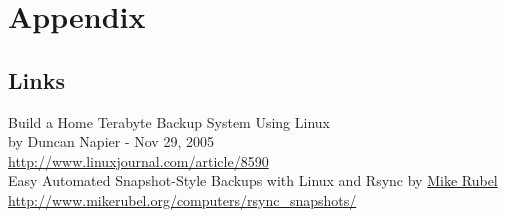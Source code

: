 \documentclass[12pt,letterpaper,dvips]{article}
\begin{document}

\clearpage
\newpage
\section*{Appendix}

\subsection*{Links}
Build a Home Terabyte Backup System Using Linux\\
by Duncan Napier - Nov 29, 2005\\
\href{http://www.linuxjournal.com/article/8590}{http://www.linuxjournal.com/article/8590}\\

\noindent Easy Automated Snapshot-Style Backups with Linux and Rsync
by \href{http://www.mikerubel.org/}{Mike Rubel}\\
\href{http://www.mikerubel.org/computers/rsync_snapshots/}{http://www.mikerubel.org/computers/rsync\_snapshots/}\\

\end{document}

